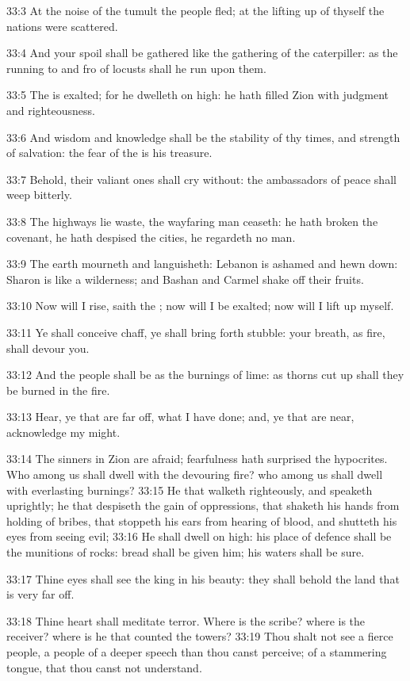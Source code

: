 33:3 At the noise of the tumult the people fled; at the lifting up of thyself the nations were scattered.

33:4 And your spoil shall be gathered like the gathering of the caterpiller: as the running to and fro of locusts shall he run upon them.

33:5 The \LORD is exalted; for he dwelleth on high: he hath filled Zion with judgment and righteousness.

33:6 And wisdom and knowledge shall be the stability of thy times, and strength of salvation: the fear of the \LORD is his treasure.

33:7 Behold, their valiant ones shall cry without: the ambassadors of peace shall weep bitterly.

33:8 The highways lie waste, the wayfaring man ceaseth: he hath broken the covenant, he hath despised the cities, he regardeth no man.

33:9 The earth mourneth and languisheth: Lebanon is ashamed and hewn down: Sharon is like a wilderness; and Bashan and Carmel shake off their fruits.

33:10 Now will I rise, saith the \LORD; now will I be exalted; now will I lift up myself.

33:11 Ye shall conceive chaff, ye shall bring forth stubble: your breath, as fire, shall devour you.

33:12 And the people shall be as the burnings of lime: as thorns cut up shall they be burned in the fire.

33:13 Hear, ye that are far off, what I have done; and, ye that are near, acknowledge my might.

33:14 The sinners in Zion are afraid; fearfulness hath surprised the hypocrites. Who among us shall dwell with the devouring fire? who among us shall dwell with everlasting burnings?  33:15 He that walketh righteously, and speaketh uprightly; he that despiseth the gain of oppressions, that shaketh his hands from holding of bribes, that stoppeth his ears from hearing of blood, and shutteth his eyes from seeing evil; 33:16 He shall dwell on high: his place of defence shall be the munitions of rocks: bread shall be given him; his waters shall be sure.

33:17 Thine eyes shall see the king in his beauty: they shall behold the land that is very far off.

33:18 Thine heart shall meditate terror. Where is the scribe? where is the receiver? where is he that counted the towers?  33:19 Thou shalt not see a fierce people, a people of a deeper speech than thou canst perceive; of a stammering tongue, that thou canst not understand.

